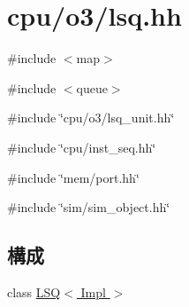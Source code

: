 \hypertarget{lsq_8hh}{
\section{cpu/o3/lsq.hh}
\label{lsq_8hh}
}
{\ttfamily \#include $<$map$>$}\par
{\ttfamily \#include $<$queue$>$}\par
{\ttfamily \#include \char`\"{}cpu/o3/lsq\_\-unit.hh\char`\"{}}\par
{\ttfamily \#include \char`\"{}cpu/inst\_\-seq.hh\char`\"{}}\par
{\ttfamily \#include \char`\"{}mem/port.hh\char`\"{}}\par
{\ttfamily \#include \char`\"{}sim/sim\_\-object.hh\char`\"{}}\par
\subsection*{構成}
\begin{DoxyCompactItemize}
\item 
class \hyperlink{classLSQ}{LSQ$<$ Impl $>$}
\end{DoxyCompactItemize}
